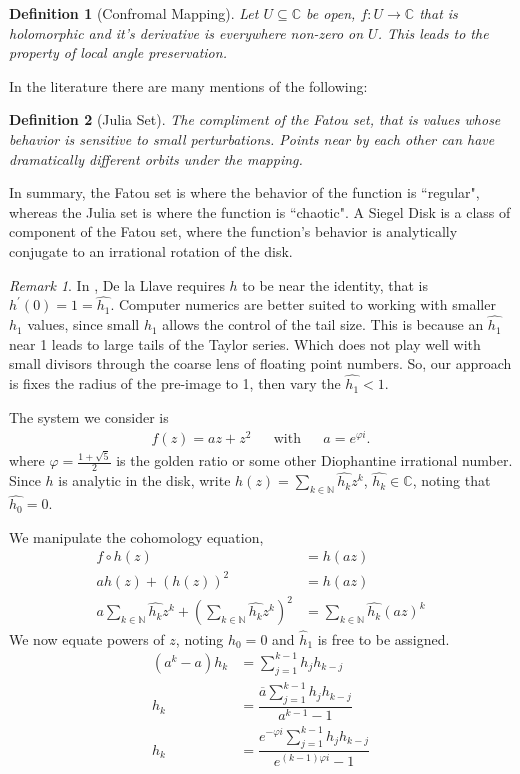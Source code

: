 \documentclass{article}
\newcommand{\C}{\mathbb{C}}
\newcommand{\N}{\mathbb{N}}
\theoremstyle{plain}
\newtheorem*{dfn}{Definition}
\theoremstyle{remark}
\newtheorem*{remark}{Remark}
\begin{document}
\begin{dfn}[Confromal Mapping]
Let $U \subseteq \C$ be open, $f: U \to \C$ that is holomorphic and it's derivative is everywhere non-zero on $U$. 
This leads to the property of local angle preservation. 
\end{dfn}

In the literature there are many mentions of the following:
\begin{dfn}[Julia Set]
The compliment of the Fatou set, that is values whose behavior is sensitive to small perturbations. 
Points near by each other can have dramatically different orbits under the mapping. 
\end{dfn}

In summary, the Fatou set is where the behavior of the function is ``regular", whereas the Julia set is where the function is ``chaotic". 
A Siegel Disk is a class of component of the Fatou set, where the function's behavior is analytically conjugate to an irrational rotation of the disk. 

\begin{remark}
In \cite{kamtutorial}, De la Llave requires $h$ to be near the identity, that is $h^\prime(0) = 1 = \hat{h_1}$. 
Computer numerics are better suited to working with smaller $h_1$ values, since small $h_1$ allows the control of the  tail size. 
This is because an $\hat{h_1}$ near 1 leads to large tails of the Taylor series. 
Which does not play well with small divisors through the coarse lens of floating point numbers. 
So, our approach is fixes the radius of the pre-image to 1, then vary the $\hat{h_1} < 1$. 
\end{remark}

The system we consider is 
\begin{align}
f(z) = az + z^2
&&
\mathrm{with} 
&& 
a = e^{\varphi i}.
\end{align}
where $\varphi = \frac{1 + \sqrt{5}}{2}$ is the golden ratio or some other Diophantine irrational number.
Since $h$ is analytic in the disk, write $h(z) = \sum_{k \in \N} \hat{h_k} z^k$, $\hat{h_k} \in \C$, noting that $\hat{h_0} = 0$.

We manipulate the cohomology equation,
\begin{align}
f \circ h (z) &= h(az)\\
ah(z) + (h(z))^2 &= h(az)\\
a\sum_{k \in \N} \hat{h_k} z^k + \left(\sum_{k \in \N}\hat{h_k} z^k\right)^2 &= \sum_{k \in \N} \hat{h_k} (az)^k
\end{align}
We now equate powers of $z$, noting $\hat{h}_0 = 0$ and $\hat{h}_1$ is free to be assigned.
\begin{align}
(a^k - a)h_k &= \sum_{j = 1}^{k-1} h_j h_{k-j} \\
h_k &= \dfrac{\overline{a}\sum_{j = 1}^{k-1} h_j h_{k-j}}{a^{k-1} - 1}  \\
h_k &= \dfrac{e^{-\varphi i}\sum_{j = 1}^{k-1} h_j h_{k-j}}{e^{(k-1)\varphi i} - 1}  \label{eqn:coeffs}
\end{align}
\end{document}
